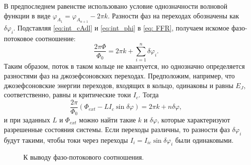 В предпоследнем равенстве использовано условие однозначности волновой функции в виде $\varphi_{A_1} = \varphi_{A_{n+1}}-2\pi k$. Разности фаз на переходах обозначены как $\delta\varphi_i$. Подставляя \eqref{eq:int_cAdl} и \eqref{eq:int_phi} в \eqref{eq: FFR}, получаем искомое фазо-потоковое соотношение:
\begin{equation}
\label{eq: FFR_final}
\frac{2\pi\Phi}{\Phi_0} = 2\pi k + \sum_{i=1}^{n}\delta\varphi_i.
\end{equation}
Таким образом, поток в таком кольце не квантуется, но однозначно определяется разностями фаз на джозефсоновских переходах. Предположим, например, что джозефсоновские энергии переходов, входящих в кольцо, одинаковы и равны $E_J$, соответственно, равны и критические токи $I_c$. Тогда
\begin{equation}\label{eq: FFR_case}
\frac{2\pi}{\Phi_0}(\Phi_{ext}-LI_c\sin \delta\varphi)= 2\pi k + n\delta\varphi,
\end{equation}
и при заданных $L\text{ и }\Phi_{ext}$ можно найти такие $k \text{ и } \delta\varphi$, которые характеризуют разрешенные состояния системы. Если переходы различны, то разности фаз $\delta\varphi_i$ будут такими, чтобы токи через переходы $I_i=I_{ic}\sin\delta\varphi_i$ были одинаковыми. 
\begin{figure}
	\centering
		\fontsize{22pt}{22pt}\selectfont
		\def\svgwidth{3.5in}%
		
	\caption{К выводу фазо-потокового соотношения.}
	\label{img:ph-fl}
\end{figure}
